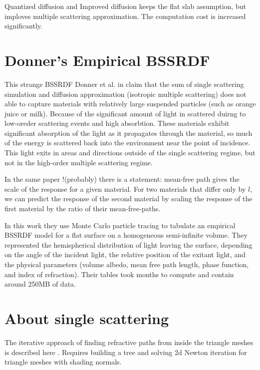 Quantized diffusion \cite{D'Eon:2011:QMR:1964921.1964951} and
Improved diffusion \cite{Habel:2013:PBD:2600890.2600896} keeps the flat slab
assumption, but imploves multiple scattering approximation. The computation cost
is increased significantly.

\section{Donner's Empirical BSSRDF}
This strange \gls{BSSRDF}
Donner et al. in \cite{Donner:2009:EBM} claim that the sum of single scattering
simulation and diffusion approximation (isotropic multiple scattering) does not
able to capture materials with relatively large suspended particles (such as
orange juice or milk). Because of the significant amount of light in scattered
duirng to low-oreder scattering events and high absorbtion.
These materials exhibit significant absorption of the light as it propagates
through the material, so much of the energy is scattered back into
the environment near the point of incidence. This light exits in areas and
directions outside of the single scattering regime, but not in the high-order
multiple scattering regime.

In the same paper !(probably) there is a statement:
mean-free path gives the scale of the response for a given material. For two
materials that differ only by $l$, we can predict the response of the second
material by scaling the response of the first material by the ratio of their
mean-free-paths.

In this work they use Monte Carlo particle tracing to tabulate an empirical
BSSRDF model for a flat surface on a homogeneous semi-infinite volume.
They represented the hemispherical distribution of light leaving the surface,
depending on the angle of the incident light, the relative position of the
exitant light, and the physical parameters (volume albedo, mean free path
length, phase function, and index of refraction). Their tables took months to
compute and contain around 250MB of data.

\section{About single scattering}
The iterative approach of finding refractive paths from inside the triangle
meshes is described here \cite{walter:inria-00388481}. Requires building a tree
and solving 2d Newton iteration for triangle meshes with shading normals.

